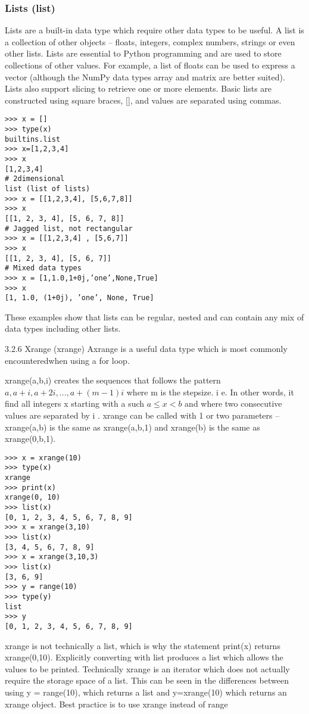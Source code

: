 \documentclass[11pt]{article} %
\begin{document}
\subsubsection{Lists (list)}
Lists are a built-in data type which require other data types to be useful. A list is a collection of other objects
– floats, integers, complex numbers, strings or even other lists. Lists are essential to Python programming
and are used to store collections of other values. For example, a list of floats can be used to express a vector
(although the NumPy data types array and matrix are better suited). Lists also support slicing to retrieve
one or more elements. Basic lists are constructed using square braces, [], and values are separated using
commas.
\begin{framed}
\begin{verbatim}
>>> x = []
>>> type(x)
builtins.list
>>> x=[1,2,3,4]
>>> x
[1,2,3,4]
# 2dimensional
list (list of lists)
>>> x = [[1,2,3,4], [5,6,7,8]]
>>> x
[[1, 2, 3, 4], [5, 6, 7, 8]]
# Jagged list, not rectangular
>>> x = [[1,2,3,4] , [5,6,7]]
>>> x
[[1, 2, 3, 4], [5, 6, 7]]
# Mixed data types
>>> x = [1,1.0,1+0j,’one’,None,True]
>>> x
[1, 1.0, (1+0j), ’one’, None, True]
\end{verbatim}
\end{framed}
These examples show that lists can be regular, nested and can contain any mix of data types including
other lists.

\newpage

3.2.6 Xrange (xrange)
Axrange is a useful data type which is most commonly encounteredwhen using a for loop. 

xrange(a,b,i)
creates the sequences that follows the pattern $a, a +i , a +2i , . . . , a +(m -1)i$ where m is the stepsize.
i e. In other
words, it find all integers x starting with a such $a \leq x < b$ and where two consecutive values are separated
by i . 
xrange can be called with 1 or two parameters – xrange(a,b) is the same as xrange(a,b,1)
and xrange(b) is the same as xrange(0,b,1).
\begin{framed}
\begin{verbatim}
>>> x = xrange(10)
>>> type(x)
xrange
>>> print(x)
xrange(0, 10)
>>> list(x)
[0, 1, 2, 3, 4, 5, 6, 7, 8, 9]
>>> x = xrange(3,10)
>>> list(x)
[3, 4, 5, 6, 7, 8, 9]
>>> x = xrange(3,10,3)
>>> list(x)
[3, 6, 9]
>>> y = range(10)
>>> type(y)
list
>>> y
[0, 1, 2, 3, 4, 5, 6, 7, 8, 9]
\end{verbatim}
\end{framed}
xrange is not technically a list, which is why the statement print(x) returns xrange(0,10). Explicitly
converting with list produces a list which allows the values to be printed. Technically xrange is an iterator
which does not actually require the storage space of a list. This can be seen in the differences between
using y = range(10), which returns a list and y=xrange(10) which returns an xrange object. Best practice
is to use xrange instead of range
\end{document}
